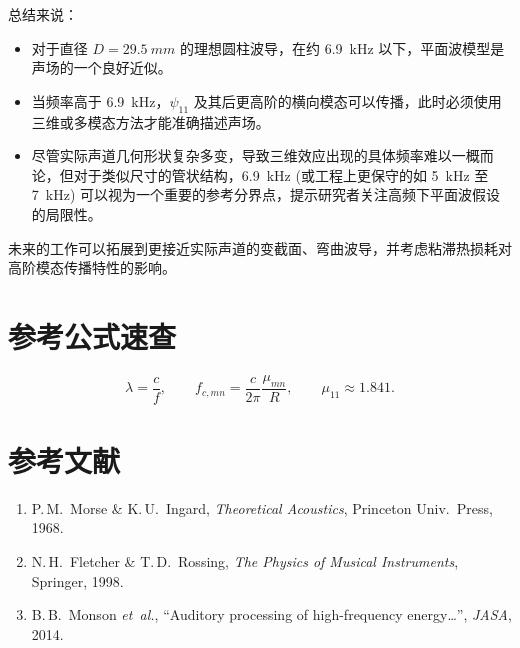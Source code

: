 \documentclass[12pt,a4paper]{article}
\begin{document}
总结来说：
\begin{itemize}
    \item 对于直径 $D=\SI{29.5}{mm}$ 的理想圆柱波导，在约 \SI{6.9}{kHz} 以下，平面波模型是声场的一个良好近似。
    \item 当频率高于 \SI{6.9}{kHz}，$\psi_{11}$ 及其后更高阶的横向模态可以传播，此时必须使用三维或多模态方法才能准确描述声场。
    \item 尽管实际声道几何形状复杂多变，导致三维效应出现的具体频率难以一概而论，但对于类似尺寸的管状结构，\SI{6.9}{kHz} (或工程上更保守的如 \SI{5}{\kilo\hertz} 至 \SI{7}{\kilo\hertz}) 可以视为一个重要的参考分界点，提示研究者关注高频下平面波假设的局限性。
\end{itemize}
未来的工作可以拓展到更接近实际声道的变截面、弯曲波导，并考虑粘滞热损耗对高阶模态传播特性的影响。

\section{参考公式速查}

\[
    \boxed{\lambda = \dfrac{c}{f}}, \qquad
    \boxed{f_{c,mn} = \dfrac{c}{2\pi}\dfrac{\mu_{mn}}{R}}, \qquad
    \boxed{\mu_{11}\approx1.841}.
\]

\section{参考文献}

\begin{enumerate}
    \item P.\,M.~Morse \& K.\,U.~Ingard, \emph{Theoretical Acoustics}, Princeton Univ.\ Press, 1968.
    \item N.\,H.~Fletcher \& T.\,D.~Rossing, \emph{The Physics of Musical Instruments}, Springer, 1998.
    \item B.\,B.~Monson \emph{et~al.}, ``Auditory processing of high-frequency energy…'', \emph{JASA}, 2014.
\end{enumerate}
\end{document}
